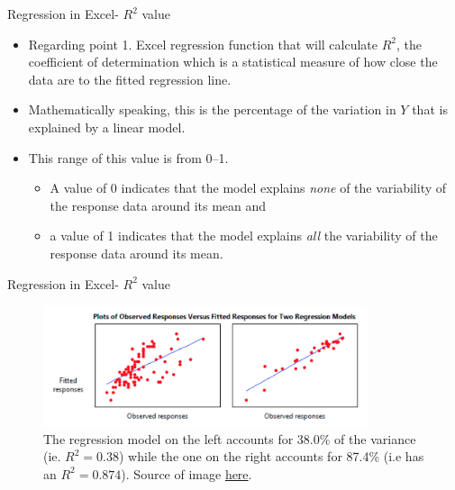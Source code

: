 \documentclass[xcolor=svgnames, handout]{beamer}
\begin{document}
\begin{frame}[label=current]{Regression in Excel- $R^2$ value}
\begin{itemize}
\item Regarding point 1. Excel regression function that will calculate $R^2$, the coefficient of determination which is a statistical measure of how close the data are to the fitted regression line.
\medskip
\item Mathematically speaking, this is the percentage of the variation in $Y$ that is explained by a linear model. 
\medskip
\item This range of this value is from 0--1.
\begin{itemize} 
\item A value of 0 indicates that the model explains \textit{none} of the variability of the response data around its mean and 
\item a value of 1 indicates that the model explains \textit{all} the variability of the response data around its mean.
\end{itemize}
\end{itemize}
\end{frame}

\begin{frame}{Regression in Excel- $R^2$ value}
\begin{figure}[h]
\begin{center}
\includegraphics[width=0.85\textwidth]{img/rsquared.png}
\caption{The regression model on the left accounts for 38.0\% of the variance (ie. $R^2 = 0.38$) while the one on the right accounts for 87.4\% (i.e has an $R^2 = 0.874$). Source of image \href{https://blog.minitab.com/blog/adventures-in-statistics-2/regression-analysis-how-do-i-interpret-r-squared-and-assess-the-goodness-of-fit}{here}.}
\label{default}
\end{center}
\end{figure}

\end{frame}
\end{document}
